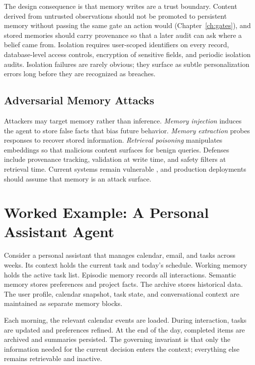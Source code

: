 \documentclass[11pt]{book}
\begin{document}
The design consequence is that memory writes are a trust boundary. Content derived from untrusted observations should not be promoted to persistent memory without passing the same gate an action would (Chapter~\ref{ch:gates}), and stored memories should carry provenance so that a later audit can ask where a belief came from. Isolation requires user-scoped identifiers on every record, database-level access controls, encryption of sensitive fields, and periodic isolation audits. Isolation failures are rarely obvious; they surface as subtle personalization errors long before they are recognized as breaches.

\subsection{Adversarial Memory Attacks}

Attackers may target memory rather than inference. \textit{Memory injection} induces the agent to store false facts that bias future behavior. \textit{Memory extraction} probes responses to recover stored information. \textit{Retrieval poisoning} manipulates embeddings so that malicious content surfaces for benign queries. Defenses include provenance tracking, validation at write time, and safety filters at retrieval time. Current systems remain vulnerable \cite{memoryprivacy2025}, and production deployments should assume that memory is an attack surface.

\section{Worked Example: A Personal Assistant Agent}

Consider a personal assistant that manages calendar, email, and tasks across weeks. Its context holds the current task and today's schedule. Working memory holds the active task list. Episodic memory records all interactions. Semantic memory stores preferences and project facts. The archive stores historical data. The user profile, calendar snapshot, task state, and conversational context are maintained as separate memory blocks.

Each morning, the relevant calendar events are loaded. During interaction, tasks are updated and preferences refined. At the end of the day, completed items are archived and summaries persisted. The governing invariant is that only the information needed for the current decision enters the context; everything else remains retrievable and inactive.
\end{document}
